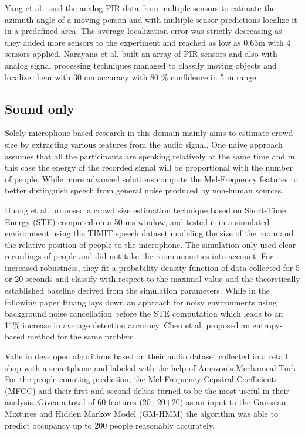 Yang et al. \cite{PIR_tracking_yang2019new} used the analog PIR data from multiple sensors to estimate the azimuth angle of a moving person and with multiple sensor predictions localize it in a predefined area. The average localization error was strictly decreasing as they added more sensors to the experiment and reached as low as 0.63m with 4 sensors applied. Narayana et al. \cite{Naray15PIR_loc} built an array of PIR sensors and also with analog signal processing techniques managed to classify moving objects and localize them with 30 cm accuracy with 80 \% confidence in 5 m range.


\subsection{Sound only}
Solely microphone-based research in this domain mainly aims to estimate crowd size by extracting various features from the audio signal. One naive approach assumes that all the participants are speaking relatively at the same time and in this case the energy of the recorded signal will be proportional with the number of people. While more advanced solutions compute the Mel-Frequency features to better distinguish speech from general noise produced by non-human sources.

Huang et al. \cite{Aud_crowd_ste_huang} proposed a crowd size estimation technique based on Short-Time Energy (STE) computed on a 50 ms window, and tested it in a simulated environment using the TIMIT speech dataset \cite{timit} modeling the size of the room and the relative position of people to the microphone. The simulation only used clear recordings of people and did not take the room acoustics into account. For increased robustness, they fit a probability density function of data collected for 5 or 20 seconds and classify with respect to the maximal value and the theoretically established baseline derived from the simulation parameters. While in the following paper Huang  \cite{Aud_sound_cancellation} lays down an approach for noisy environments using background noise cancellation before the STE computation which leads to an 11\% increase in average detection accuracy.
Chen et al. \cite{Aud_crowd_entropy_Chen} proposed an entropy-based method for the same problem.

Valle in \cite{aud_gm_hmm} developed algorithms based on their audio dataset collected in a retail shop with a smartphone and labeled with the help of Amazon's Mechanical Turk. For the people counting prediction, the Mel-Frequency Cepstral Coefficients (MFCC) and their first and second deltas turned to be the most useful in their analysis. Given a total of 60 features (20+20+20) as an input to the Gaussian Mixtures and Hidden Markov Model (GM-HMM) the algorithm was able to predict occupancy up to 200 people reasonably accurately.


